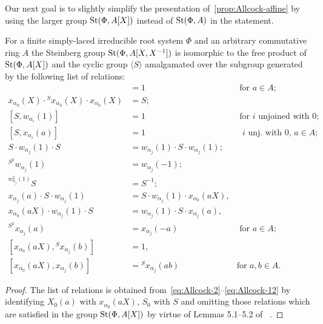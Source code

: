 Our next goal is to slightly simplify the presentation of~\cref{prop:Allcock-affine} by using the larger group $\operatorname{St}(\Phi, A[X])$ instead of $\operatorname{St}(\Phi, A)$ in the statement.
\begin{cor} \label{cor:Allcock-simpler}
    For a finite simply-laced irreducible root system $\Phi$ and an arbitrary commutative ring $A$ the Steinberg group $\operatorname{St}(\Phi, A[X, X^{-1}])$ is isomorphic
    to the free product of $\operatorname{St}(\Phi, A[X])$ and the cyclic group $\langle S \rangle$ amalgamated over the subgroup generated by the following list of relations:
    {\allowdisplaybreaks\begin{align}
    [S^2, x_{\alpha_0}(aX)] & = 1 & \text{ for $a \in A$; } \label{eq:simpler-2} \\
    x_{\alpha_0}(X) \cdot {}^{S} x_{\alpha_0}(X) \cdot x_{\alpha_0}(X) & = S; \label{eq:simpler-3} \\
    [S, w_{\alpha_i}(1)] & = 1 & \text{ for $i$ unjoined with $0$;} \label{eq:simpler-4} \\
    [S, x_{\alpha_i}(a)] & = 1 &  \text{ $i$ unj. with $0$, $a \in A$; } \label{eq:simpler-5-1}\\
    S \cdot w_{\alpha_j}(1) \cdot S & = w_{\alpha_j}(1) \cdot S \cdot w_{\alpha_j}(1); \label{eq:simpler-7} \\
    {}^{S^2} w_{\alpha_j}(1) & = w_{\alpha_j}(-1); \label{eq:simpler-8-1} \\
    {}^{w_{\alpha_j}^2(1)} S & = S^{-1}; \label{eq:simpler-8-2} \\
    x_{\alpha_j}(a) \cdot S \cdot w_{\alpha_j}(1) & = S \cdot w_{\alpha_j}(1) \cdot x_{\alpha_0}(aX), & \label{eq:simpler-9-1} \\
    x_{\alpha_0}(aX) \cdot w_{\alpha_j}(1) \cdot S & = w_{\alpha_j}(1) \cdot S \cdot x_{\alpha_j}(a), & \label{eq:simpler-9-2} \\
    {}^{S^2} x_{\alpha_j}(a) & = x_{\alpha_j}(-a) & \text{ for $a \in A$; } \label{eq:simpler-10-1} \\
    [x_{\alpha_0}(aX), {}^{S} x_{\alpha_j}(b)] &= 1, & \label{eq:simpler-11-1} \\
    [x_{\alpha_0}(aX), x_{\alpha_j}(b)] &= {}^{S} x_{\alpha_j}(ab) & \text{for $a, b \in A.$} \label{eq:simpler-12}
    \end{align}}
\end{cor}
\begin{proof}
    The list of relations is obtained from~\eqref{eq:Allcock-2}--\eqref{eq:Allcock-12} by identifying $X_0(a)$ with $x_{\alpha_0}(aX)$, $S_0$ with $S$ and omitting those relations
     which are satisfied in the group $\operatorname{St}(\Phi, A[X])$ by virtue of Lemmas 5.1--5.2 of ~\cite{Ma69}.
\end{proof}

